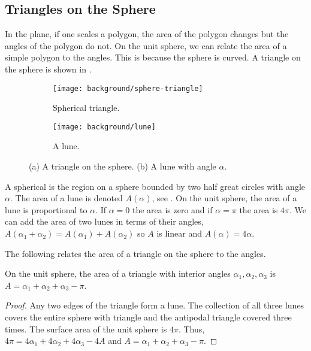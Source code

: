 	
\subsection{Triangles on the Sphere}

In the plane, if one scales a polygon, the area of the polygon changes
but the angles of the polygon do not.
On the unit sphere, we can relate the area of a simple polygon 
to the angles. This is because the sphere is curved.
A triangle on the sphere is shown in .


 \begin{figure}[htb]
         \centering
        \begin{subfigure}[b]{0.35\textwidth}
         \texttt{[image: background/sphere-triangle]}
         \caption{Spherical triangle.}
 	 \label{fig:sphere-triangle}
       \end{subfigure}
         \hspace{1cm}
         \begin{subfigure}[b]{0.35\textwidth}
         \texttt{[image: background/lune]}
         \caption{A lune.}
          \label{fig:lune}
         \end{subfigure}
		\caption{(a) A triangle on the sphere.
 		(b) A lune with angle $\alpha$.
 		\label{fig:sphere-lune}}
 \end{figure}
A spherical  is the region on a sphere bounded by two half great circles
with angle $\alpha$. The area of a lune is denoted $A(\alpha)$,
 see .
On the unit sphere, the area of a lune is proportional to $\alpha$. 
If $\alpha=0$ the area is zero and if $\alpha=\pi$ the area is $4\pi$.
We can add the area of two lunes in terms of their angles, 
$A(\alpha_1+\alpha_2)=A(\alpha_1)+A(\alpha_2)$ so $A$ is linear
and  $A(\alpha)=4\alpha.$




The following relates the area of a triangle on the sphere to the angles.

\begin{lemma}\label{lem:spherical-triangle}
On the unit sphere, the area of a triangle with interior angles $\alpha_1, \alpha_2, \alpha_3$
is $A=\alpha_1+\alpha_2+\alpha_3-\pi$.
\end{lemma}

\begin{proof}
	Any two edges of the triangle form a lune. The collection of 
	all three lunes covers the entire sphere with triangle and the antipodal triangle covered three times.
 	The surface area of the unit sphere is $4\pi$.
	Thus, $4\pi=4\alpha_1+4\alpha_2+4\alpha_3-4A$
	and $A=\alpha_1+\alpha_2+\alpha_3-\pi$.
	
\end{proof}

